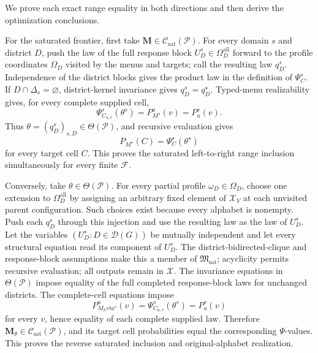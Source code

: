 We prove each exact range equality in both directions and then derive the optimization conclusions.

For the saturated frontier, first take \(\mathbf M\in\mathcal C_{\mathrm{sat}}(\mathcal P)\).  For every domain \(s\) and district \(D\), push the law of the full response block \(U_D^s\in\Omega_D^{\mathrm{all}}\) forward to the profile coordinates \(\Omega_D\) visited by the menus and targets; call the resulting law \(q_D^s\).  Independence of the district blocks gives the product law in the definition of \(\Psi_C^s\).  If \(D\cap\Delta_s=\varnothing\), district-kernel invariance gives \(q_D^s=q_D^\star\).  Typed-menu realizability gives, for every complete supplied cell,
\[
\Psi_{C_{a,v}}^s(\theta^s)=P_{M^s}^{a}(v)=P_a^s(v).
\]
Thus \(\theta=(q_D^s)_{s,D}\in\Theta(\mathcal P)\), and recursive evaluation gives
\[
P_{M^\star}(C)=\Psi_C^\star(\theta^\star)
\]
for every target cell \(C\).  This proves the saturated left-to-right range inclusion simultaneously for every finite \(\mathcal F\).

Conversely, take \(\theta\in\Theta(\mathcal P)\).  For every partial profile \(\omega_D\in\Omega_D\), choose one extension to \(\Omega_D^{\mathrm{all}}\) by assigning an arbitrary fixed element of \(\mathcal X_V\) at each unvisited parent configuration.  Such choices exist because every alphabet is nonempty.  Push each \(q_D^s\) through this injection and use the resulting law as the law of \(U_D^s\).  Let the variables \((U_D^s:D\in\mathcal D(G))\) be mutually independent and let every structural equation read its component of \(U_D^s\).  The district-bidirected-clique and response-block assumptions make this a member of \(\mathfrak M_{\mathrm{sat}}\); acyclicity permits recursive evaluation; all outputs remain in \(\mathcal X\).  The invariance equations in \(\Theta(\mathcal P)\) impose equality of the full completed response-block laws for unchanged districts.  The complete-cell equations impose
\[
P_{M_  heta^s}^{a}(v)=\Psi_{C_{a,v}}^s(\theta^s)=P_a^s(v)
\]
for every \(v\), hence equality of each complete supplied law.  Therefore \(\mathbf M_\theta\in\mathcal C_{\mathrm{sat}}(\mathcal P)\), and its target cell probabilities equal the corresponding \(\Psi\)-values.  This proves the reverse saturated inclusion and original-alphabet realization.

